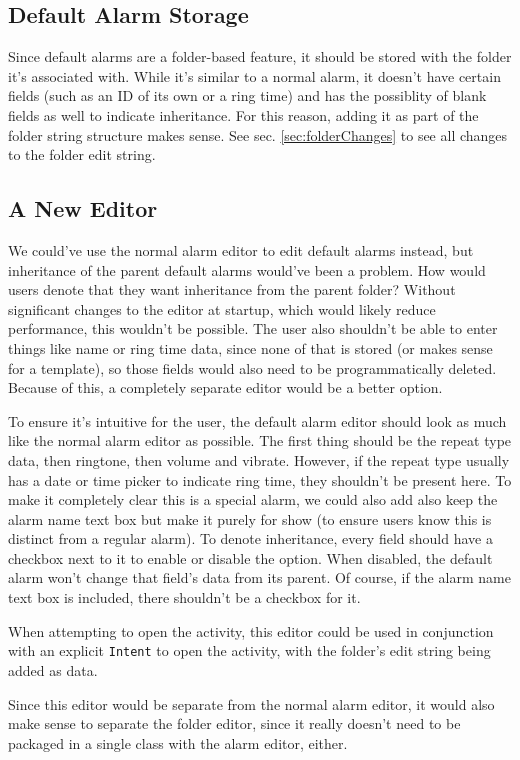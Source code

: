 \documentclass[11pt]{article} %
\begin{document}
\subsection{Default Alarm Storage}
Since default alarms are a folder-based feature, it should be stored with the folder it's associated with. While it's similar to a normal alarm, it doesn't have certain fields (such as an ID of its own or a ring time) and has the possiblity of blank fields as well to indicate inheritance. For this reason, adding it as part of the folder string structure makes sense. See sec. \ref{sec:folderChanges} to see all changes to the folder edit string.

\subsection{A New Editor}
We could've use the normal alarm editor to edit default alarms instead, but inheritance of the parent default alarms would've been a problem. How would users denote that they want inheritance from the parent folder? Without significant changes to the editor at startup, which would likely reduce performance, this wouldn't be possible. The user also shouldn't be able to enter things like name or ring time data, since none of that is stored (or makes sense for a template), so those fields would also need to be programmatically deleted. Because of this, a completely separate editor would be a better option.

To ensure it's intuitive for the user, the default alarm editor should look as much like the normal alarm editor as possible. The first thing should be the repeat type data, then ringtone, then volume and vibrate. However, if the repeat type usually has a date or time picker to indicate ring time, they shouldn't be present here. To make it completely clear this is a special alarm, we could also add also keep the alarm name text box but make it purely for show (to ensure users know this is distinct from a regular alarm). To denote inheritance, every field should have a checkbox next to it to enable or disable the option. When disabled, the default alarm won't change that field's data from its parent. Of course, if the alarm name text box is included, there shouldn't be a checkbox for it.

When attempting to open the activity, this editor could be used in conjunction with an explicit \verb|Intent| to open the activity, with the folder's edit string being added as data. 

Since this editor would be separate from the normal alarm editor, it would also make sense to separate the folder editor, since it really doesn't need to be packaged in a single class with the alarm editor, either. 
\end{document}
